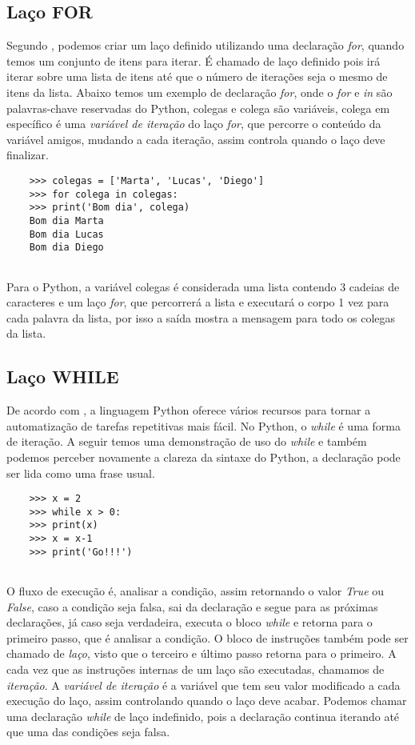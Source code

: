            \subsection{Laço FOR}
	Segundo \cite{Severance2016}, podemos criar um laço definido utilizando uma declaração \textit{for}, quando temos um conjunto de itens para iterar. É chamado de laço definido pois irá iterar sobre uma lista de itens até que o número de iterações seja o mesmo de itens da lista. Abaixo temos um exemplo de declaração \textit{for}, onde o \textit{for} e \textit{in} são palavras-chave reservadas do Python, colegas e colega são variáveis, colega em específico é uma \textit{variável de iteração} do laço \textit{for}, que percorre o conteúdo da variável amigos, mudando a cada iteração, assim controla quando o laço deve finalizar.
	\begin{lstlisting}
	>>> colegas = ['Marta', 'Lucas', 'Diego']
	>>> for colega in colegas:
	>>>	print('Bom dia', colega)
	Bom dia Marta
	Bom dia Lucas
	Bom dia Diego
		
	\end{lstlisting}
	Para o Python, a variável colegas é considerada uma lista contendo 3 cadeias de caracteres e um laço \textit{for}, que percorrerá a lista e executará o corpo 1 vez para cada palavra da lista, por isso a saída mostra a mensagem para todo os colegas da lista.
            \subsection{Laço WHILE}
	De acordo com \cite{Severance2016}, a linguagem Python oferece vários recursos para tornar a automatização de tarefas repetitivas mais fácil. No Python, o \textit{while} é uma forma de iteração. A seguir temos uma demonstração de uso do \textit{while} e também podemos perceber novamente a clareza da sintaxe do Python, a declaração pode ser lida como uma frase usual.
	\begin{lstlisting}
	>>> x = 2
	>>> while x > 0:
	>>>	print(x)
	>>>	x = x-1
	>>> print('Go!!!')
		
	\end{lstlisting}
	O fluxo de execução é, analisar a condição, assim retornando o valor \textit{True} ou \textit{False}, caso a condição seja falsa, sai da declaração e segue para as próximas declarações, já caso seja verdadeira, executa o bloco \textit{while} e retorna para o primeiro passo, que é analisar a condição. O bloco de instruções também pode ser chamado de \textit{laço}, visto que o terceiro e último passo retorna para o primeiro. A cada vez que as instruções internas de um laço são executadas, chamamos de \textit{iteração}. A \textit{variável de iteração} é a variável que tem seu valor modificado a cada execução do laço, assim controlando quando o laço deve acabar. Podemos chamar uma declaração \textit{while} de laço indefinido, pois a declaração continua iterando até que uma das condições seja falsa.
	
